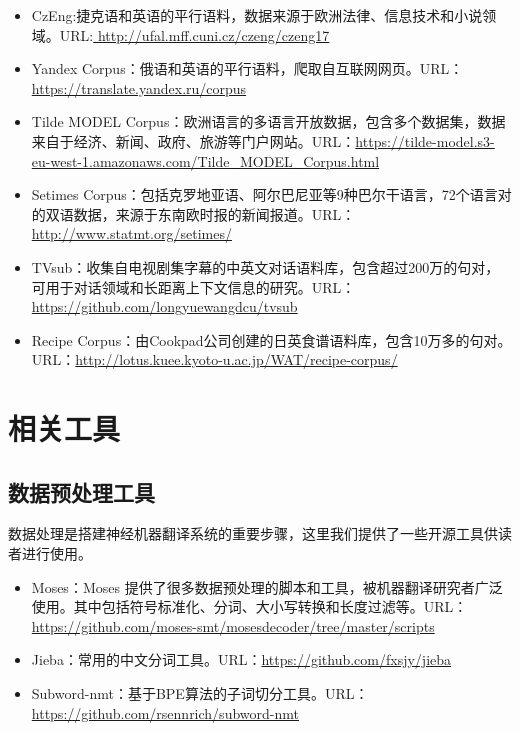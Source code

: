 \begin{appendices}
\begin{itemize}
\vspace{0.5em}
\item CzEng:捷克语和英语的平行语料，数据来源于欧洲法律、信息技术和小说领域。URL:\url{ http://ufal.mff.cuni.cz/czeng/czeng17}
\vspace{0.5em}
\item Yandex Corpus：俄语和英语的平行语料，爬取自互联网网页。URL：\url{https://translate.yandex.ru/corpus}
\vspace{0.5em}
\item Tilde MODEL Corpus：欧洲语言的多语言开放数据，包含多个数据集，数据来自于经济、新闻、政府、旅游等门户网站。URL：\url{https://tilde-model.s3-eu-west-1.amazonaws.com/Tilde_MODEL_Corpus.html}
\vspace{0.5em}
\item Setimes Corpus：包括克罗地亚语、阿尔巴尼亚等9种巴尔干语言，72个语言对的双语数据，来源于东南欧时报的新闻报道。URL：\url{http://www.statmt.org/setimes/}
\vspace{0.5em}
\item TVsub：收集自电视剧集字幕的中英文对话语料库，包含超过200万的句对，可用于对话领域和长距离上下文信息的研究。URL：\url{https://github.com/longyuewangdcu/tvsub}
\vspace{0.5em}
\item Recipe Corpus：由Cookpad公司创建的日英食谱语料库，包含10万多的句对。URL：\url{http://lotus.kuee.kyoto-u.ac.jp/WAT/recipe-corpus/}
\end{itemize}


\section{相关工具}


\subsection{数据预处理工具}
\parinterval 数据处理是搭建神经机器翻译系统的重要步骤，这里我们提供了一些开源工具供读者进行使用。
\vspace{0.5em}
\begin{itemize}
\item Moses：Moses 提供了很多数据预处理的脚本和工具，被机器翻译研究者广泛使用。其中包括符号标准化、分词、大小写转换和长度过滤等。URL：\url{https://github.com/moses-smt/mosesdecoder/tree/master/scripts}
\vspace{0.5em}
\item Jieba：常用的中文分词工具。URL：\url{https://github.com/fxsjy/jieba}
\vspace{0.5em}
\item Subword-nmt：基于BPE算法的子词切分工具。URL：\url{https://github.com/rsennrich/subword-nmt}
\end{itemize}


\end{appendices}
